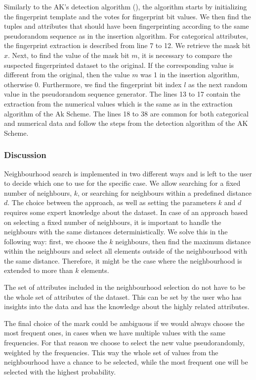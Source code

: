 Similarly to the AK's detection algorithm (), the algorithm starts by initializing the fingerprint template and the votes for fingerprint bit values. 
We then find the tuples and attributes that should have been fingerprinting according to the same pseudorandom sequence as in the insertion algorithm. 
For categorical attributes, the fingerprint extraction is described from line 7 to 12. 
We retrieve the mask bit $x$.
Next, to find the value of the mask bit $m$, it is necessary to compare the suspected fingerprinted dataset to the original. 
If the corresponding value is different from the original, then the value $m$ was 1 in the insertion algorithm, otherwise 0. 
Furthermore, we find the fingerprint bit index $l$ as the next random value in the pseudorandom sequence generator.
The lines 13 to 17 contain the extraction from the numerical values which is the same as in the extraction algorithm of the Ak Scheme.
The lines 18 to 38 are common for both categorical and numerical data and follow the steps from the detection algorithm of the AK Scheme. 

\subsubsection{Discussion}
Neighbourhood search is implemented in two different ways and is left to the user to decide which one to use for the specific case. We allow searching for a fixed number of neighbours, $k$, or searching for neighbours within a predefined distance $d$. 
The choice between the approach, as well as setting the parameters $k$ and $d$ requires some expert knowledge about the dataset. 
In case of an approach based on selecting a fixed number of neighbours, it is important to handle the neighbours with the same distances deterministically. We solve this in the following way: first, we choose the $k$ neighbours, then find the maximum distance within the neighbours and select all elements outside of the neighbourhood with the same distance. 
Therefore, it might be the case where the neighbourhood is extended to more than $k$ elements.

The set of attributes included in the neighbourhood selection do not have to be the whole set of attributes of the dataset. 
This can be set by the user who has insights into the data and has the knowledge about the highly related attributes. 

The final choice of the mark could be ambiguous if we would always choose the most frequent ones, in cases when we have multiple values with the same frequencies. 
For that reason we choose to select the new value pseudorandomly, weighted by the frequencies. This way the whole set of values from the neighbourhood have a chance to be selected, while the most frequent one will be selected with the highest probability.

